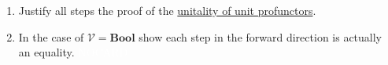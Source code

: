 \begin{enumerate}
    \item Justify all steps the proof of the \href{doc/1 math/Seven Sketches in Compositionality/Chapter 4: Co-design/3 Categories of profunctors/2 The categories V-Prof and Feas/4 Unitality of unit profunctor}{unitality of unit profunctors}.
    \item In the case of $\mathcal{V}=\mathbf{Bool}$ show each step in the forward direction is actually an equality. \textcolor{white}{NOCARD}
  \end{enumerate}